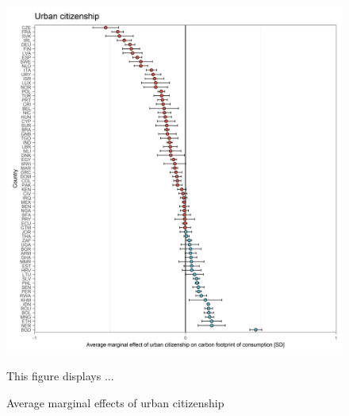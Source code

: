 \documentclass[12pt, a4paper]{article}
\newenvironment{subcaption}
{\strut
\vspace{-5pt}
\begin{minipage}[b]{0.9\textwidth}
  \hspace*{-\parindent}
  \footnotesize}
 {\end{minipage}}
\begin{document}
\begin{figure}[ht!]
  \centering
 \caption{Average marginal effects of urban citizenship} \label{fig:D5_Urban}
  \includegraphics{Analysis_OLS_ME_Carbon_Footprint/AME_OLS_FP_urban_01}
  \begin{subcaption}
    This figure displays ...
  \end{subcaption}

\end{figure}

\clearpage
\end{document}

